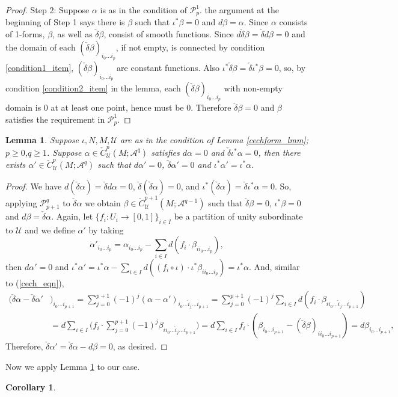 \documentclass[11pt]{article}
\newtheorem{lmm}[thm]{Lemma}
\newtheorem{crl}[thm]{Corollary}
\theoremstyle{definition}
\theoremstyle{remark}
\def\cA{\mathcal{A}}
\def\cP{\mathcal{P}}
\def\cU{\mathcal{U}}
\begin{document}
\begin{appendices}
\begin{proof}
Step 2: Suppose $\alpha$ is as in the condition of $\cP^1_p$. the argument at the beginning of Step 1 says there is $\beta$ such that $\iota^*\beta=0$ and $d\beta=\alpha$. 
Since $\alpha$ consists of 1-forms, $\beta$, as well as $\check\delta\beta$, consist of smooth functions. Since $d\check\delta\beta=\check\delta d\beta=0$ and the domain of each $(\check\delta\beta)_{i_0\ldots i_p}$, if not empty, is connected by condition \ref{condition1_item}, $(\check\delta\beta)_{i_0\ldots i_p}$ are constant functions. 
Also $\iota^*\check\delta\beta=\check\delta\iota^*\beta=0$, 
so, by condition \ref{condition2_item} in the lemma, each $(\check\delta\beta)_{i_0\ldots i_p}$ with non-empty domain is 0 at at least one point, hence must be 0. 
Therefore $\check\delta\beta=0$ and $\beta$ satisfies the requirement in $\cP^1_p$. 
\end{proof}
\begin{lmm}\label{cechform2_lmm}
Suppose $\iota,N,M,\cU$ are as in the condition of Lemma \ref{cechform_lmm}; $p\ge0$,$q\ge1$. Suppose $\alpha\in\check{C}^p_\cU(M;\cA^q)$ satisfies $d\alpha=0$ and $\check\delta\iota^*\alpha=0$, then there exists $\alpha'\in\check{C}^p_\cU(M;\cA^q)$ such that $d\alpha'=0$, $\check\delta\alpha'=0$ and $\iota^*\alpha'=\iota^*\alpha$. 
\end{lmm}
\begin{proof}
We have $d(\check\delta\alpha)=\check\delta d\alpha=0$, $\check\delta(\check\delta\alpha)=0$, and $\iota^*(\check\delta\alpha)=\check\delta\iota^*\alpha=0$. 
So, applying $\cP^q_{p+1}$ to $\check\delta\alpha$ we obtain $\beta\in\check{C}^{p+1}_\cU(M;\cA^{q-1})$ such that $\check\delta\beta=0$, $\iota^*\beta=0$ and $d\beta=\check\delta\alpha$. 
Again, let $\{f_i:U_i\to[0,1]\}_{i\in I}$ be a partition of unity subordinate to $\cU$ and we define $\alpha'$ by taking
$$\alpha'_{i_0\ldots i_p}=\alpha_{i_0\ldots i_p}-\sum_{i\in I}d(f_i\cdot \beta_{ii_0\ldots i_p}),$$
then $d\alpha'=0$ and $\iota^*\alpha'=\iota^*\alpha-\sum_{i\in I}d((f_i\circ\iota)\cdot\iota^*\beta_{ii_0\ldots i_p})=\iota^*\alpha$. And, similar to (\ref{cech_eqn}), 
\begin{align*}
(\check\delta\alpha-\check\delta\alpha'&)_{i_0\ldots i_{p+1}}
=\sum_{j=0}^{p+1}(-1)^j(\alpha-\alpha')_{i_0\ldots\hat{i}_j\ldots i_{p+1}}
=\sum_{j=0}^{p+1}(-1)^j\sum_{i\in I}d(f_i\cdot\beta_{ii_0\ldots\hat{i}_j\ldots i_{p+1}})\\
&=d\sum_{i\in I}\Big(f_i\cdot \sum_{j=0}^{p+1}(-1)^j\beta_{ii_0\ldots\hat{i}_j\ldots i_{p+1}} \Big)
=d\sum_{i\in I}f_i\cdot (\beta_{i_0\ldots i_{p+1}}-(\check\delta\beta)_{ii_0\ldots i_{p+1}})
=d\beta_{i_0\ldots i_{p+1}}, 
\end{align*}
Therefore, $\check\delta\alpha'=\check\delta\alpha-d\beta=0$, as desired. 
\end{proof}
Now we apply Lemma \ref{cechform2_lmm} to our case. 
\begin{crl}\label{formpatching_crl}

\end{crl}

\end{appendices}
\end{document}
